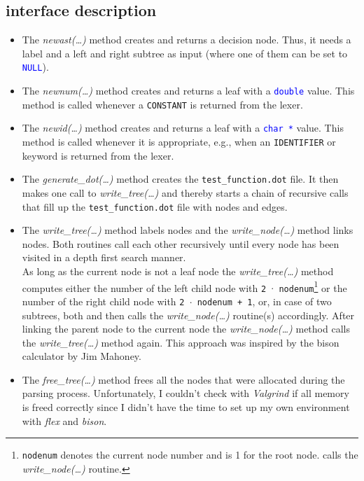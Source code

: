 \documentclass{scrartcl}
\begin{document}
\subsection*{interface description}
\begin{itemize}

\item The \textit{newast(\ldots)} method creates and returns a decision node. Thus, it needs a label and a left and right subtree as input (where one of them can be set to \texttt{\textcolor{blue}{NULL}}).

\item The \textit{newnum(\ldots)} method creates and returns a leaf with a \texttt{\textcolor{blue}{double}} value. This method is called whenever a \texttt{CONSTANT} is returned from the lexer.

\item The \textit{newid(\ldots)} method creates and returns a leaf with a \texttt{\textcolor{blue}{char *}} value. This method is called whenever it is appropriate, e.g., when an \texttt{IDENTIFIER} or keyword is returned from the lexer.

\item The \textit{generate\_dot(\ldots)} method creates the \texttt{test\_function.dot} file. It then makes one call to \textit{write\_tree(\ldots)} and thereby starts a chain of recursive calls that fill up the \texttt{test\_function.dot} file with nodes and edges.

\item The \textit{write\_tree(\ldots)} method labels nodes and the \textit{write\_node(\ldots)} method links nodes. Both routines call each other recursively until every node has been visited in a depth first search manner.\\
As long as the current node is not a leaf node the \textit{write\_tree(\ldots)} method computes either the number of the left child node with \texttt{2 $\cdot$ nodenum}\footnote{\texttt{nodenum} denotes the current node number and is 1 for the root node. calls the \textit{write\_node(\ldots)} routine.} or the number of the right child node with \texttt{2 $\cdot$ nodenum + 1}, or, in case of two subtrees, both and then calls the \textit{write\_node(\ldots)} routine(s) accordingly. After linking the parent node to the current node the \textit{write\_node(\ldots)} method calls the \textit{write\_tree(\ldots)} method again. This approach was inspired by the bison calculator by Jim Mahoney\cite{calc}.

\item The \textit{free\_tree(\ldots)} method frees all the nodes that were allocated during the parsing process. Unfortunately, I couldn't check with \textit{Valgrind} if all memory is freed correctly since I didn't have the time to set up my own environment with \textit{flex} and \textit{bison}.

\end{itemize}
\end{document}
